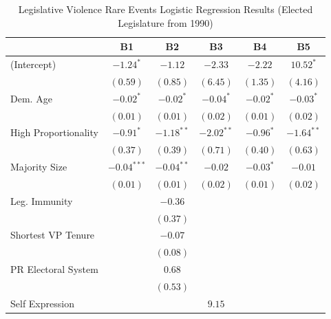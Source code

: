\documentclass[a4paper]{article}\usepackage{graphicx, color}
\begin{document}
\begin{table}
\caption{Legislative Violence Rare Events Logistic Regression Results (Elected Legislature from 1990)}
\label{outputTable.1990}
\begin{center}

\begin{tabular}{l c c c c c }
\hline
                     & B1 & B2 & B3 & B4 & B5 \\
\hline
(Intercept)          & $-1.24^{*}$   & $-1.12$      & $-2.33$      & $-2.22$     & $10.52^{*}$   \\
                     & $(0.59)$      & $(0.85)$     & $(6.45)$     & $(1.35)$    & $(4.16)$      \\
Dem. Age             & $-0.02^{*}$   & $-0.02^{*}$  & $-0.04^{*}$  & $-0.02^{*}$ & $-0.03^{*}$   \\
                     & $(0.01)$      & $(0.01)$     & $(0.02)$     & $(0.01)$    & $(0.02)$      \\
High Proportionality & $-0.91^{*}$   & $-1.18^{**}$ & $-2.02^{**}$ & $-0.96^{*}$ & $-1.64^{**}$  \\
                     & $(0.37)$      & $(0.39)$     & $(0.71)$     & $(0.40)$    & $(0.63)$      \\
Majority Size        & $-0.04^{***}$ & $-0.04^{**}$ & $-0.02$      & $-0.03^{*}$ & $-0.01$       \\
                     & $(0.01)$      & $(0.01)$     & $(0.02)$     & $(0.01)$    & $(0.02)$      \\
Leg. Immunity        &               & $-0.36$      &              &             &               \\
                     &               & $(0.37)$     &              &             &               \\
Shortest VP Tenure   &               & $-0.07$      &              &             &               \\
                     &               & $(0.08)$     &              &             &               \\
PR Electoral System  &               & $0.68$       &              &             &               \\
                     &               & $(0.53)$     &              &             &               \\
Self Expression      &               &              & $9.15$       &             &               \\

\end{tabular}
\end{center}
\end{table}
\end{document}
